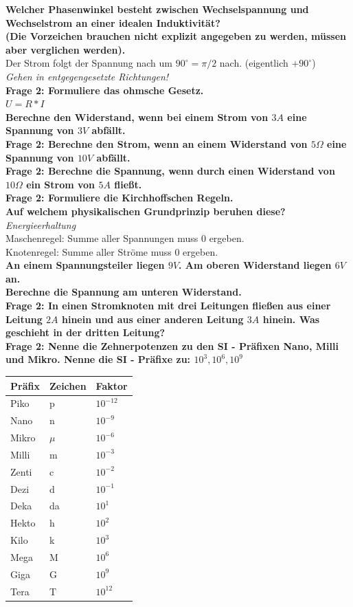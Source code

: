 \documentclass[11pt,a4paper]{scrartcl}
\begin{document}
\textbf{Welcher Phasenwinkel besteht zwischen Wechselspannung und Wechselstrom an einer idealen Induktivität?\\
(Die Vorzeichen brauchen nicht explizit angegeben zu werden, müssen aber verglichen werden).}\\
Der Strom folgt der Spannung nach um $90^\circ=\pi/2$ nach. (eigentlich $+90^\circ$)\\
\textit{Gehen in entgegengesetzte Richtungen!}\\
\textbf{Frage 2: Formuliere das ohmsche Gesetz.}\\
$U=R*I$\\
\textbf{Berechne den Widerstand, wenn bei einem Strom von $3A$ eine Spannung von $3V$ abfällt.}\\
\textbf{Frage 2: Berechne den Strom, wenn an einem Widerstand von $5\Omega$ eine Spannung von $10V$ abfällt.}\\
\textbf{Frage 2: Berechne die Spannung, wenn durch einen Widerstand von $10\Omega$ ein Strom von $5A$ fließt. }\\
\textbf{Frage 2: Formuliere die Kirchhoffschen Regeln.}\\
\textbf{Auf welchem physikalischen Grundprinzip beruhen diese?}\\
\textit{Energieerhaltung}\\
Maschenregel: Summe aller Spannungen muss 0 ergeben.\\
Knotenregel: Summe aller Ströme muss 0 ergeben.\\
\textbf{An einem Spannungsteiler liegen $9V$. Am oberen Widerstand liegen $6V$ an.}\\
\textbf{Berechne die Spannung am unteren Widerstand.}\\
\textbf{Frage 2: In einen Stromknoten mit drei Leitungen fließen aus einer Leitung $2A$ hinein und aus einer anderen Leitung $3A$ hinein. Was geschieht in der dritten Leitung?}\\
\textbf{Frage 2: Nenne die Zehnerpotenzen zu den SI - Präfixen Nano, Milli und Mikro. Nenne die SI - Präfixe zu: $10^3, 10^6, 10^9$}\\
\begin{tabular}{|l|l|l|}
\hline
\textbf{Präfix} & \textbf{Zeichen} & \textbf{Faktor}\\
\hline\hline
Piko   & p  & $10^{-12}$\\
\hline
Nano   & n  & $10^{-9}$\\
\hline
Mikro  & $\mu$ & $10^{-6}$\\
\hline
Milli  & m  & $10^{-3}$\\
\hline
Zenti  & c  & $10^{-2}$\\
\hline
Dezi   & d  & $10^{-1}$\\
\hline\hline
Deka   & da & $10^{1}$\\
\hline
Hekto  & h  & $10^{2}$\\
\hline
Kilo   & k  & $10^{3}$\\
\hline
Mega   & M  & $10^{6}$\\
\hline
Giga   & G  & $10^{9}$\\
\hline
Tera   & T  & $10^{12}$\\
\hline
\end{tabular}\\
\end{document}
